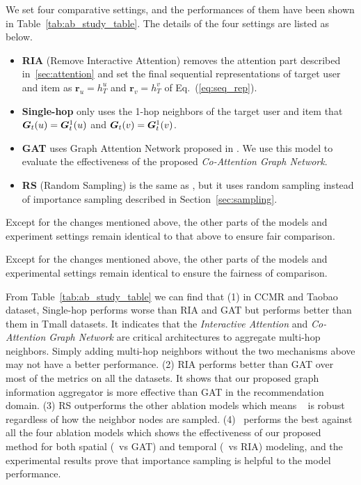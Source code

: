 We set four comparative settings, and the performances of them have been shown in Table~\ref{tab:ab_study_table}.
The details of the four settings are listed as below.
\begin{itemize}[leftmargin=15pt]
	\item \textbf{RIA} (Remove Interactive Attention) removes the attention part described in~\ref{sec:attention} and set the final sequential representations of target user and item as $\bm r_u = h_T^u$ and $\bm r_v = h_T^v$ of Eq.~(\ref{eq:seq_rep}).
	\item \textbf{Single-hop} only uses the 1-hop neighbors of the target user and item that $\bm{G}_t(u) = \bm{G}^1_t(u)$ and $\bm{G}_t(v) = \bm{G}^1_t(v)$.
	\item \textbf{GAT} uses Graph Attention Network proposed in \cite{velivckovic2017graph}. We use this model to evaluate the effectiveness of the proposed \textit{Co-Attention Graph Network}.
	\item \textbf{RS} (Random Sampling) is the same as \score, but it uses random sampling instead of importance sampling described in Section~\ref{sec:sampling}.
\end{itemize}
Except for the changes mentioned above, the other parts of the models and experiment settings remain identical to that above to ensure fair comparison.

Except for the changes mentioned above, the other parts of the models and experimental settings remain identical to ensure the fairness of comparison.

From Table~\ref{tab:ab_study_table} we can find that (1) in CCMR and Taobao dataset, Single-hop performs worse than RIA and GAT but performs better than them in Tmall datasets. It indicates that the \textit{Interactive Attention} and \textit{Co-Attention Graph Network} are critical architectures to aggregate multi-hop neighbors. Simply adding multi-hop neighbors without the two mechanisms above may not have a better performance. (2) RIA performs better than GAT over most of the metrics on all the datasets. It shows that our proposed graph information aggregator is more effective than GAT in the recommendation domain. (3) RS outperforms the other ablation models which means \score~ is robust regardless of how the neighbor nodes are sampled. (4) \score~performs the best against all the four ablation models which shows the effectiveness of our proposed method for both spatial (\score~vs GAT) and temporal (\score~vs RIA) modeling, and the experimental results prove that importance sampling is helpful to the model performance.

